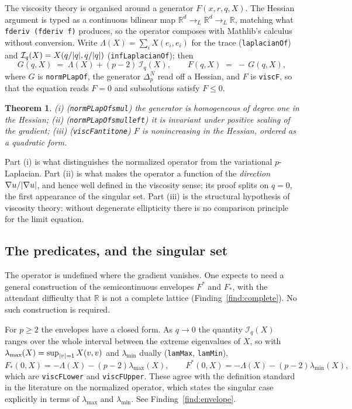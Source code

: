 \documentclass[11pt,reqno]{amsart}
\newcommand{\LEANREF}[1]{\texttt{\small\def\_{\textunderscore\allowbreak}#1}}
\newcommand{\R}{\mathbb{R}}
\newcommand{\pnlap}{\Delta_p^{N}}
\DeclarePairedDelimiter{\abs}{\lvert}{\rvert}
\theoremstyle{plain}
\newtheorem{theorem}{Theorem}[section]
\theoremstyle{definition}
\begin{document}
The viscosity theory is organised around a generator $F(x,r,q,X)$. The Hessian
argument is typed as a continuous bilinear map
$\R^d \to_L \R^d \to_L \R$, matching what \LEANREF{fderiv (fderiv f)}
produces, so the operator composes with Mathlib's calculus without conversion.
Write $\Lambda(X) = \sum_i X(e_i,e_i)$ for the trace
(\LEANREF{laplacianOf}) and
$\mathcal{I}_q(X) = X(q/\abs{q}, q/\abs{q})$
(\LEANREF{infLaplacianOf}); then
\begin{equation}\label{eq:gen}
  G(q,X) \;=\; \Lambda(X) + (p-2)\,\mathcal{I}_q(X),
  \qquad F(q,X) \;=\; -\,G(q,X),
\end{equation}
where $G$ is \LEANREF{normPLapOf}, the generator $\pnlap$ read off a Hessian,
and $F$ is \LEANREF{viscF}, so that the equation reads $F = 0$ and
subsolutions satisfy $F \le 0$.

\begin{theorem}\label{thm:elliptic}
\emph{(i)} \emph{(\LEANREF{normPLapOf\_smul})} the generator is homogeneous of
degree one in the Hessian;
\emph{(ii)} \emph{(\LEANREF{normPLapOf\_smul\_left})} it is invariant under
positive scaling of the gradient;
\emph{(iii)} \emph{(\LEANREF{viscF\_antitone})} $F$ is nonincreasing in the
Hessian, ordered as a quadratic form.
\end{theorem}

Part (i) is what distinguishes the normalized operator from the variational
$p$-Laplacian. Part (ii) is what makes the operator a function of the
\emph{direction} $\nabla u/\abs{\nabla u}$, and hence well defined in the
viscosity sense; its proof splits on $q = 0$, the first appearance of the
singular set. Part (iii) is the structural hypothesis of viscosity theory:
without degenerate ellipticity there is no comparison principle for the limit
equation.

\subsection{The predicates, and the singular set}\label{ssec:visc}

The operator is undefined where the gradient vanishes. One expects to need a
general construction of the semicontinuous envelopes $F^*$ and $F_*$, with the
attendant difficulty that $\R$ is not a complete lattice
(Finding~\ref{find:complete}). No such construction is required.

For $p \ge 2$ the envelopes have a closed form. As $q \to 0$ the quantity
$\mathcal{I}_q(X)$ ranges over the whole interval between the extreme
eigenvalues of $X$, so with
$\lambda_{\max}(X) = \sup_{\abs{v}=1} X(v,v)$ and
$\lambda_{\min}$ dually (\LEANREF{lamMax}, \LEANREF{lamMin}),
\begin{equation}\label{eq:envelopes}
  F_*(0,X) = -\Lambda(X) - (p-2)\lambda_{\max}(X), \qquad
  F^*(0,X) = -\Lambda(X) - (p-2)\lambda_{\min}(X),
\end{equation}
which are \LEANREF{viscFLower} and \LEANREF{viscFUpper}. These agree with the
definition standard in the literature on the normalized operator, which states
the singular case explicitly in terms of $\lambda_{\max}$ and
$\lambda_{\min}$. See Finding~\ref{find:envelope}.
\end{document}

